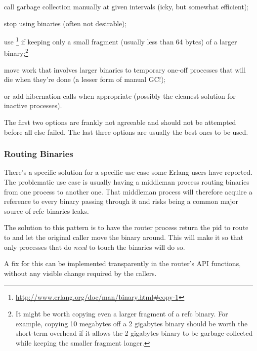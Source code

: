 \begin{itemize*}
	\item call garbage collection manually at given intervals (icky, but somewhat efficient);
	\item stop using binaries (often not desirable);
	\item use \footnote{\href{http://www.erlang.org/doc/man/binary.html\#copy-1}{http://www.erlang.org/doc/man/binary.html\#copy-1}} if keeping only a small fragment (usually less than 64 bytes) of a larger binary;\footnote{It might be worth copying even a larger fragment of a refc binary. For example, copying 10 megabytes off a 2 gigabytes binary should be worth the short-term overhead if it allows the 2 gigabytes binary to be garbage-collected while keeping the smaller fragment longer.}
	\item move work that involves larger binaries to temporary one-off processes that will die when they're done (a lesser form of manual GC!);
	\item or add hibernation calls when appropriate (possibly the cleanest solution for inactive processes).
\end{itemize*}

The first two options are frankly not agreeable and should not be attempted before all else failed. The last three options are usually the best ones to be used.

\subsubsection{Routing Binaries}

There's a specific solution for a specific use case some Erlang users have reported. The problematic use case is usually having a middleman process routing binaries from one process to another one. That middleman process will therefore acquire a reference to every binary passing through it and risks being a common major source of refc binaries leaks.

The solution to this pattern is to have the router process return the pid to route to and let the original caller move the binary around. This will make it so that only processes that do \emph{need} to touch the binaries will do so.

A fix for this can be implemented transparently in the router's API functions, without any visible change required by the callers.

